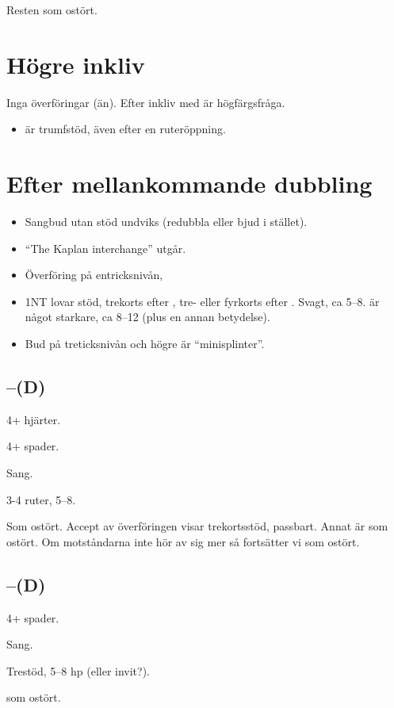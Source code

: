 Resten som ostört.

\section{Högre inkliv}

Inga överföringar (än). Efter inkliv med  är  högfärgsfråga.

\begin{itemize}

\item {} är trumfstöd, även efter en ruteröppning.


\end{itemize}

\section{Efter mellankommande dubbling}

\begin{itemize}
\item Sangbud utan stöd undviks (redubbla eller bjud  i stället). 
\item ``The
Kaplan interchange'' utgår. 
\item Överföring på entricksnivån, 
\item 1NT lovar stöd, trekorts efter , tre- eller fyrkorts efter
  . Svagt, ca 5--8.  är något starkare, ca 8--12 (plus en
  annan betydelse).  
\item Bud på treticksnivån och högre är ``minisplinter''. 
\end{itemize}

\subsection{--(D)}
\bbe
\item[RD] 4+ hjärter.
\item[\hj{1}] 4+ spader.
\item[\spa{1}] Sang.
\item[\NT{1}] 3-4 ruter, 5--8.
\item[Resten] Som ostört.
\ebe
Accept av överföringen visar trekortsstöd, passbart. Annat är som ostört.
Om motståndarna inte hör av sig mer så fortsätter vi som ostört.
\subsection{--(D)}
\bbe
\item[RD] 4+ spader.
\item[\spa{1}] Sang.
\item[\NT{1}] Trestöd, 5--8 hp (eller invit?).
\item[Resten] som ostört.
\ebe

